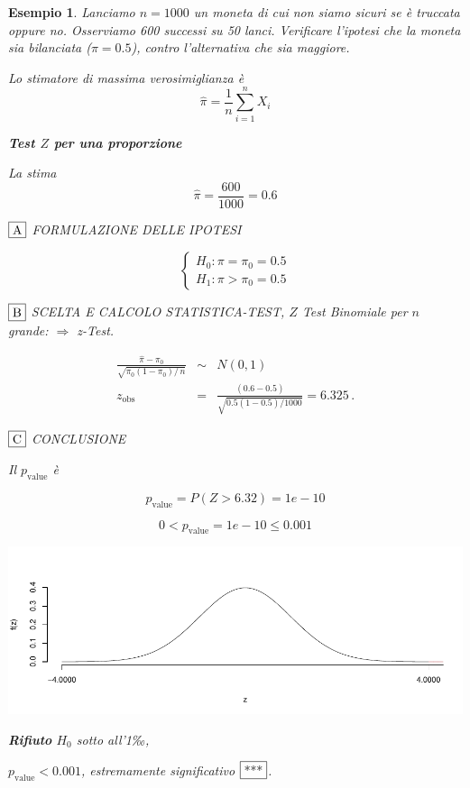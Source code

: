 \documentclass[
  11pt,
]{book}
\theoremstyle{mytheoremstyle}
\theoremstyle{mydefstyle}
\newtheorem{example}{{Esempio}}[section]
\begin{document}
\begin{example}
Lanciamo \(n=1000\) un moneta di cui non siamo sicuri se è truccata oppure
no. Osserviamo 600 successi su 50 lanci. Verificare l'ipotesi che la moneta sia bilanciata (\(\pi=0.5\)), contro
l'alternativa che sia maggiore.

Lo stimatore di massima verosimiglianza è
\[\hat\pi=\frac 1 n \sum_{i=1}^n X_i\]

\textbf{Test \(Z\) per una proporzione}

La stima
\[\hat\pi=\frac { 600 } { 1000 }= 0.6  \]

\(\fbox{A}\) FORMULAZIONE DELLE IPOTESI

\[\begin{cases}
   H_0: \pi = \pi_0=0.5 \\
   H_1: \pi > \pi_0=0.5 
   \end{cases}\]

\(\fbox{B}\) SCELTA E CALCOLO STATISTICA-TEST, \(Z\)
Test Binomiale per \(n\) grande: \(\Rightarrow\) z-Test.

\begin{eqnarray*}
   \frac{\hat\pi - \pi_{0}} {\sqrt {\pi_0(1-\pi_0)/\,n}}&\sim&N(0,1)\\
   z_{\text{obs}}
   &=& \frac{ ( 0.6 -  0.5 )} {\sqrt{ 0.5 (1- 0.5 )/ 1000 }}
   =   6.325 \,.
   \end{eqnarray*}

\(\fbox{C}\) CONCLUSIONE

Il \(p_{\text{value}}\) è

\[ p_{\text{value}} = P(Z>6.32)=1e-10 \]

\[
 0 < p_\text{value}= 1e-10 \leq 0.001 
\]

\begin{center}\includegraphics{Appunti_di_Statistica_2025_files/figure-latex/15-test-mu-pi-11,-1} \end{center}

\textbf{Rifiuto} \(H_0\) sotto all'1‰,

\(p_\text{value}<0.001\), \emph{estremamente significativo} \(\fbox{***}\).
\end{example}
\end{document}
